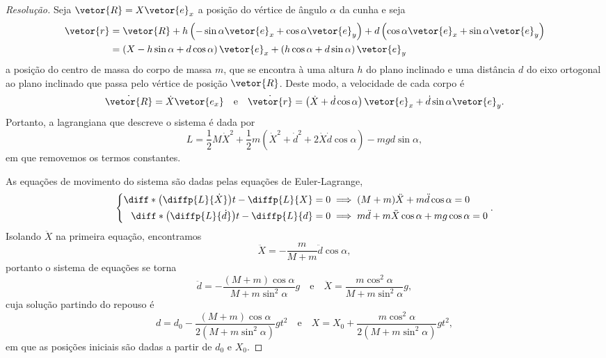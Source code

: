 \begin{proof}[Resolução]
    Seja \(\vetor{R} = X\vetor{e}_x\) a posição do vértice de ângulo \(\alpha\) da cunha e seja
    \begin{align*}
        \vetor{r} &= \vetor{R} + h\left(-\sin\alpha\vetor{e}_x + \cos\alpha \vetor{e}_y\right) + d\left(\cos\alpha \vetor{e}_x + \sin\alpha\vetor{e}_y\right)\\
                  &= \left(X - h\sin\alpha + d\cos\alpha\right)\vetor{e}_x + \left(h\cos\alpha + d\sin \alpha\right)\vetor{e}_y
    \end{align*}
    a posição do centro de massa do corpo de massa \(m\), que se encontra à uma altura \(h\) do plano inclinado e uma distância \(d\) do eixo ortogonal ao plano inclinado que passa pelo vértice de posição \(\vetor{R}\). Deste modo, a velocidade de cada corpo é
    \begin{equation*}
        \dot{\vetor{R}} = \dot{X} \vetor{e_x}\quad\text{e}\quad\dot{\vetor{r}} = \left(\dot{X} + \dot{d}\cos\alpha\right)\vetor{e}_x + \dot{d}\sin \alpha\vetor{e}_y.
    \end{equation*}
    Portanto, a lagrangiana que descreve o sistema é dada por
    \begin{equation*}
        L = \frac12 M\dot{X}^2 + \frac12 m \left(\dot{X}^2 + \dot{d}^2 + 2\dot{X}\dot{d}\cos\alpha\right) - mgd\sin\alpha,
    \end{equation*}
    em que removemos os termos constantes.

    As equações de movimento do sistema são dadas pelas equações de Euler-Lagrange,
    \begin{equation*}
        \left\{\begin{aligned}
            \diff*{\left(\diffp{L}{\dot{X}}\right)}{t} - \diffp{L}{X} = 0 &\implies (M+m)\ddot{X} + m\ddot{d}\cos\alpha = 0\\
            \diff*{\left(\diffp{L}{\dot{d}}\right)}{t} - \diffp{L}{d} = 0 &\implies m\ddot{d} + m\ddot{X}\cos\alpha + mg\cos\alpha = 0
        \end{aligned}\right..
    \end{equation*}
    Isolando \(\ddot{X}\) na primeira equação, encontramos
    \begin{equation*}
        \ddot{X} = -\frac{m}{M+m} \ddot{d}\cos\alpha,
    \end{equation*}
    portanto o sistema de equações se torna
    \begin{equation*}
        \ddot{d} = - \frac{(M+m)\cos\alpha}{M+m\sin^2\alpha}g\quad\text{e}\quad\ddot{X} = \frac{m \cos^2\alpha}{M+m \sin^2\alpha}g,
    \end{equation*}
    cuja solução partindo do repouso é
    \begin{equation*}
        d = d_0 - \frac{(M+m)\cos \alpha}{2\left(M + m\sin^2\alpha\right)}gt^2\quad\text{e}\quad X = X_0 + \frac{m\cos^2\alpha}{2\left(M+m\sin^2\alpha\right)}gt^2,
    \end{equation*}
    em que as posições iniciais são dadas a partir de \(d_0\) e \(X_0\).


\end{proof}
